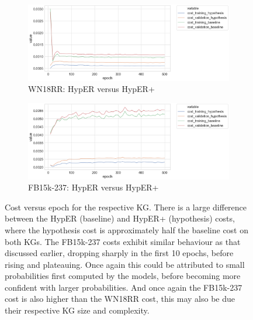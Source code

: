 \begin{figure}[H]
	\begin{subfigure}[b]{.5\linewidth}
   		\centering
    		\includegraphics[width=1.0\linewidth, height=0.6\linewidth]{WN18RR_Cost_Results}
		\captionsetup{justification=centering}
		\caption{WN18RR: HypER versus HypER+}
	\end{subfigure}
	\begin{subfigure}[b]{.5\linewidth}
   		\centering
		\includegraphics[width=1.0\linewidth, height=0.6\linewidth]{FB15k-237_Cost_Results}
		\captionsetup{justification=centering}
		\caption{FB15k-237: HypER versus HypER+}
	\end{subfigure}
	\caption{Cost versus epoch for the respective KG. There is a large difference between the HypER (baseline) and HypER+ (hypothesis) costs, where the hypothesis cost is approximately half the baseline cost on both KGs. The FB15k-237 costs exhibit similar behaviour as that discussed earlier, dropping sharply in the first 10 epochs, before rising and plateauing. Once again this could be attributed to small probabilities first computed by the models, before becoming more confident with larger probabilities. And once again the FB15k-237 cost is also higher than the WN18RR cost, this may also be due their respective KG size and complexity.}
\end{figure}

